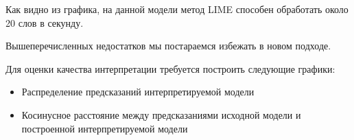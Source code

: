 \documentclass[a4paper, 12pt]{article}
\begin{document}
Как видно из графика, на данной модели метод LIME способен обработать около 20 слов в секунду.

Вышеперечисленных недостатков мы постараемся избежать в новом подходе.

Для оценки качества интерпретации требуется построить следующие графики:
\begin{itemize}
\item Распределение предсказаний интерпретируемой модели

\item Косинусное расстояние между предсказаниями исходной модели и построенной интерпретируемой модели
\end{itemize}



\end{document}
